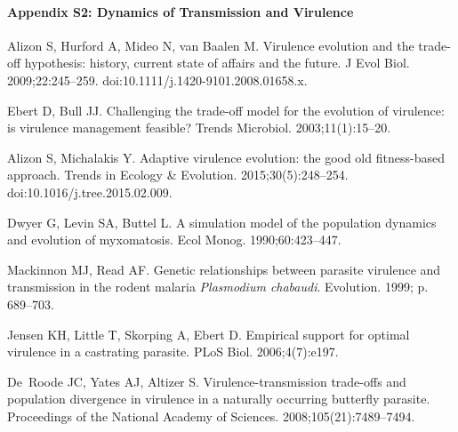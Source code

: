 \documentclass[10pt,letterpaper]{article}
\providecommand{\DIFdelbegin}{} %
\providecommand{\DIFdelend}{} %
\newcommand{\DIFscaledelfig}{0.5}
\newlength{\DIFdelgraphicswidth} %
\newlength{\DIFdelgraphicsheight} %
\newcommand{\DIFdelincludegraphics}[2][]{%
\sbox{\DIFdelgraphicsbox}{\DIFOincludegraphics[#1]{#2}}%
\settoboxwidth{\DIFdelgraphicswidth}{\DIFdelgraphicsbox} %
\settoboxtotalheight{\DIFdelgraphicsheight}{\DIFdelgraphicsbox} %
\scalebox{\DIFscaledelfig}{%
\parbox[b]{\DIFdelgraphicswidth}{\usebox{\DIFdelgraphicsbox}\\[-\baselineskip] \rule{\DIFdelgraphicswidth}{0em}}\llap{\resizebox{\DIFdelgraphicswidth}{\DIFdelgraphicsheight}{%
\setlength{\unitlength}{\DIFdelgraphicswidth}%
\begin{picture}(1,1)%
\thicklines\linethickness{2pt} %
{\color[rgb]{1,0,0}\put(0,0){\framebox(1,1){}}}%
{\color[rgb]{1,0,0}\put(0,0){\line( 1,1){1}}}%
{\color[rgb]{1,0,0}\put(0,1){\line(1,-1){1}}}%
\end{picture}%
}\hspace*{3pt}}} %
} %
\DeclareRobustCommand{\DIFdelbegin}{\DIFOdelbegin \let\includegraphics\DIFdelincludegraphics} %
\DeclareRobustCommand{\DIFdelend}{\DIFOaddend \let\includegraphics\DIFOincludegraphics} %
\begin{document}
\paragraph*{Appendix S2: Dynamics of Transmission and Virulence}
\DIFdelbegin %

\DIFdelend \label{S2_Appendix}

\clearpage

\nolinenumbers

%
%
% 

\begin{thebibliography}{10}

Alizon S, Hurford A, Mideo N, van Baalen M.
\newblock Virulence evolution and the trade-off hypothesis: history, current
  state of affairs and the future.
\newblock J Evol Biol. 2009;22:245--259.
\newblock doi:{10.1111/j.1420-9101.2008.01658.x}.

Ebert D, Bull JJ.
\newblock Challenging the trade-off model for the evolution of virulence: is
  virulence management feasible?
\newblock Trends Microbiol. 2003;11(1):15--20.

Alizon S, Michalakis Y.
\newblock Adaptive virulence evolution: the good old fitness-based approach.
\newblock Trends in Ecology \& Evolution. 2015;30(5):248--254.
\newblock doi:{10.1016/j.tree.2015.02.009}.

Dwyer G, Levin SA, Buttel L.
\newblock A simulation model of the population dynamics and evolution of
  myxomatosis.
\newblock Ecol Monog. 1990;60:423--447.

Mackinnon MJ, Read AF.
\newblock Genetic relationships between parasite virulence and transmission in
  the rodent malaria {{\em Plasmodium chabaudi}}.
\newblock Evolution. 1999; p. 689--703.

Jensen KH, Little T, Skorping A, Ebert D.
\newblock Empirical support for optimal virulence in a castrating parasite.
\newblock PLoS Biol. 2006;4(7):e197.

De~Roode JC, Yates AJ, Altizer S.
\newblock Virulence-transmission trade-offs and population divergence in
  virulence in a naturally occurring butterfly parasite.
\newblock Proceedings of the National Academy of Sciences.
  2008;105(21):7489--7494.


\end{thebibliography}
\end{document}
